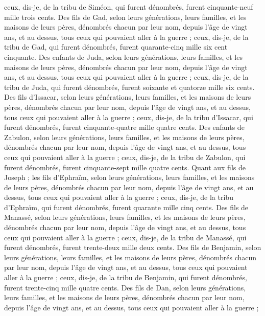 \begin{multicols}{2}
ceux, dis-je, de la tribu de Siméon, qui furent dénombrés, furent cinquante-neuf mille trois cents.
Des fils de Gad, selon leurs générations, leurs familles, et les maisons de leurs pères, dénombrés chacun par leur nom, depuis l'âge de vingt ans, et au dessus, tous ceux qui pouvaient aller à la guerre ;
ceux, dis-je, de la tribu de Gad, qui furent dénombrés, furent quarante-cinq mille six cent cinquante.
Des enfants de Juda, selon leurs générations, leurs familles, et les maisons de leurs pères, dénombrés chacun par leur nom, depuis l'âge de vingt ans, et au dessus, tous ceux qui pouvaient aller à la guerre ;
ceux, dis-je, de la tribu de Juda, qui furent dénombrés, furent soixante et quatorze mille six cents.
Des fils d'Issacar, selon leurs générations, leurs familles, et les maisons de leurs pères, dénombrés chacun par leur nom, depuis l'âge de vingt ans, et au dessus, tous ceux qui pouvaient aller à la guerre ;
ceux, dis-je, de la tribu d'Issacar, qui furent dénombrés, furent cinquante-quatre mille quatre cents.
Des enfants de Zabulon, selon leurs générations, leurs familles, et les maisons de leurs pères, dénombrés chacun par leur nom, depuis l'âge de vingt ans, et au dessus, tous ceux qui pouvaient aller à la guerre ;
ceux, dis-je, de la tribu de Zabulon, qui furent dénombrés, furent cinquante-sept mille quatre cents.
Quant aux fils de Joseph ; les fils d'Ephraïm, selon leurs générations, leurs familles, et les maisons de leurs pères, dénombrés chacun par leur nom, depuis l'âge de vingt ans, et au dessus, tous ceux qui pouvaient aller à la guerre ;
ceux, dis-je, de la tribu d'Ephraïm, qui furent dénombrés, furent quarante mille cinq cents.
Des fils de Manassé, selon leurs générations, leurs familles, et les maisons de leurs pères, dénombrés chacun par leur nom, depuis l'âge de vingt ans, et au dessus, tous ceux qui pouvaient aller à la guerre ;
ceux, dis-je, de la tribu de Manassé, qui furent dénombrés, furent trente-deux mille deux cents.
Des fils de Benjamin, selon leurs générations, leurs familles, et les maisons de leurs pères, dénombrés chacun par leur nom, depuis l'âge de vingt ans, et au dessus, tous ceux qui pouvaient aller à la guerre ;
ceux, dis-je, de la tribu de Benjamin, qui furent dénombrés, furent trente-cinq mille quatre cents.
Des fils de Dan, selon leurs générations, leurs familles, et les maisons de leurs pères, dénombrés chacun par leur nom, depuis l'âge de vingt ans, et au dessus, tous ceux qui pouvaient aller à la guerre ;

\end{multicols}
